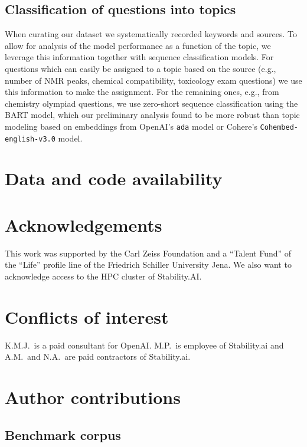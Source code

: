 \documentclass[11pt, oneside]{article}
\begin{document}
\subsection{Classification of questions into topics} \label{sec:meth-topic} When curating our dataset we systematically recorded keywords and sources. 
To allow for analysis of the model performance as a function of the topic, we leverage this information together with sequence classification models. 
For questions which can easily be assigned to a topic based on the source (e.g., number of NMR peaks, chemical compatibility, toxicology exam questions) we use this information to make the assignment. 
For the remaining ones, e.g., from chemistry olympiad questions, we use zero-short sequence classification\cite{zeroshotsequence} using the BART model\cite{bart, FacebookBART}, which our preliminary analysis found to be more robust than topic modeling based on embeddings from OpenAI's \texttt{ada} model or Cohere's \texttt{Cohembed-english-v3.0} model. 




\section*{Data and code availability} 

\section*{Acknowledgements}
This work was supported by the Carl Zeiss Foundation and a \enquote{Talent Fund} of the \enquote{Life} profile line of the Friedrich Schiller University Jena.
We also want to acknowledge access to the HPC cluster of Stability.AI.

\section*{Conflicts of interest}
K.M.J.\ is a paid consultant for OpenAI. M.P.\ is employee of Stability.ai and A.M.\ and N.A.\ are paid contractors of Stability.ai.

\section*{Author contributions}




\appendix

\subsection{Benchmark corpus}
\end{document}
